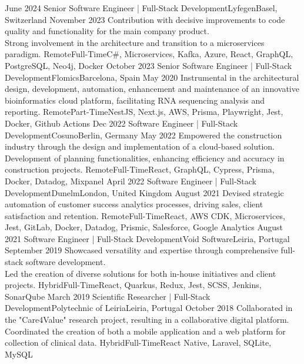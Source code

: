 %
%
%
\vspace{0.5em}
\begin{experiences}
  \experience
  {June 2024} {Senior Software Engineer | Full-Stack Development}{Lyfegen}{Basel, Switzerland}
  {November 2023}    {Contribution with decisive improvements to code quality and functionality for the main company product.\\
  Strong involvement in the architecture and transition to a microservices paradigm.}
  {Remote}{Full-Time}{C\#, Microservices, Kafka, Azure, React, GraphQL, PostgreSQL, Neo4j, Docker} 
  \emptySeparator
  \experience
  {October 2023} {Senior Software Engineer | Full-Stack Development}{Flomics}{Barcelona, Spain}
  {May 2020}    {Instrumental in the architectural design, development, automation, enhancement and maintenance of an 
  innovative bioinformatics cloud platform, facilitating RNA sequencing analysis and reporting.}
  {Remote}{Part-Time}{NestJS, Next.js, AWS, Prisma, Playwright, Jest, Docker, Github Actions}
  \emptySeparator
  \experience
  {Dec 2022} {Software Engineer | Full-Stack Development}{Cosuno}{Berlin, Germany}
  {May 2022} {Empowered the construction industry through the design and implementation of a cloud-based 
  solution.\\
  Development of planning functionalities, enhancing efficiency and accuracy in construction projects.}
  {Remote}{Full-Time}{React, GraphQL, Cypress, Prisma, Docker, Datadog, Mixpanel}
  \emptySeparator
  \experience
  {April 2022}   {Software Engineer | Full-Stack Development}{Dunelm}{London, United Kingdom}
  {August 2021} {Devised strategic automation of customer success analytics processes, driving sales,
  client satisfaction and retention.}
  {Remote}{Full-Time}{React,  AWS CDK, Microservices, Jest, GitLab, Docker, Datadog, Prismic, Salesforce, Google Analytics}
  \emptySeparator
  \experience
  {August 2021}     {Software Engineer | Full-Stack Development}{Void Software}{Leiria, Portugal}
  {September 2019}    {Showcased versatility and expertise through comprehensive full-stack software development.\\
  Led the creation of diverse solutions for both in-house initiatives and client projects.}
  {Hybrid}{Full-Time}{React, Quarkus, Redux, Jest, SCSS, Jenkins, SonarQube}
  \emptySeparator
  \experience
  {March 2019}     {Scientific Researcher | Full-Stack Development}{Polytechnic of Leiria}{Leiria, Portugal}
  {October 2018}    {Collaborated in the "Care4Value" research project, resulting in a collaborative digital platform.\\
  Coordinated the creation of both a mobile application and a web platform for collection of clinical data.}
  {Hybrid}{Full-Time}{React Native, Laravel, SQLite, MySQL}
\end{experiences}